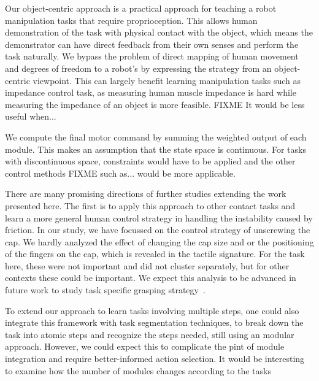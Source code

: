 Our object-centric approach is a practical approach for teaching a
robot manipulation tasks that require proprioception. This allows
human demonstration of the task with physical contact with the object,
which means the demonstrator can have direct feedback from their own
senses and perform the task naturally. We bypass the problem of direct
mapping of human movement and degrees of freedom to a robot's by
expressing the strategy from an object-centric viewpoint. This can
largely benefit learning manipulation tasks such as impedance control
task, as measuring human muscle impedance is hard while measuring the
impedance of an object is more feasible.  FIXME It would be less
useful when... %

We compute the final motor command by summing the weighted output of
each module. This makes an assumption that the state space is
continuous. For tasks with discontinuous space, constraints would have
to be applied and the other control methods FIXME such as...  %
would be more applicable.  

There are many promising directions of further studies extending the
work presented here. The first is to apply this approach to other
contact tasks and learn a more general human control strategy in
handling the instability caused by friction.
In our study, we have focussed on the control strategy of unscrewing
the cap. We hardly analyzed the effect of changing the cap size and or
the positioning of the fingers on the cap, which is revealed in the
tactile signature.  For the task here, these were not important and
did not cluster separately, but for other contexts these could be
important. We expect this analysis to be advanced in future work to
study task specific grasping
strategy~\citep{el2013generation,dang2014semantic}. %

To extend our approach to learn tasks involving multiple steps, one
could also integrate this framework with task segmentation techniques,
to break down the task into atomic steps and recognize the steps
needed, still using an modular approach. However, we could expect this
to complicate the pint of module integration and require
better-informed action selection.  It would be interesting to examine
how the number of modules changes according to the tasks %

